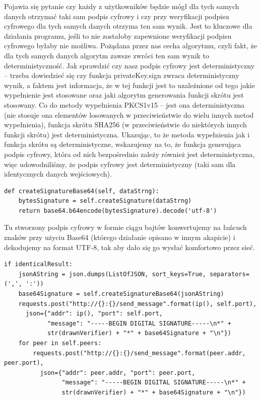 Pojawia się pytanie czy każdy z użytkowników będzie mógł dla tych samych danych otrzymać taki sam podpis cyfrowy i czy przy weryfikacji podpisu cyfrowego dla tych samych danych otrzyma ten sam wynik. Jest to kluczowe dla działania programu, jeśli to nie zostałoby zapewnione weryfikacji podpisu cyfrowego byłaby nie możliwa. Pożądana przez nas cecha algorytmu, czyli fakt, że dla tych samych danych algorytm zawsze zwróci ten sam wynik to deterministyczność. Jak sprawdzić czy nasz podpis cyfrowy jest deterministyczny – trzeba dowiedzieć się czy funkcja privateKey.sign zwraca deterministyczny wynik, a faktem jest informacja, że w tej funkcji jest to uzależnione od tego jakie wypełnienie jest stosowane oraz jaki algorytm generowania funkcji skrótu jest stosowany. Co do metody wypełnienia PKCS1v15 – jest ona deterministyczna (nie stosuje ona elementów losowanych w przeciwieństwie do wielu innych metod wypełnienia), funkcja skrótu SHA256 (w przeciwieństwie do niektórych innych funkcji skrótu) jest deterministyczna. Ukazując, to że metoda wypełnienia jak i funkcja skrótu są deterministyczne, wskazujemy na to, że funkcja generująca podpis cyfrowy, która od nich bezpośrednio zależy również jest deterministyczna, więc udowodniliśmy, że podpis cyfrowy jest deterministyczny (taki sam dla identycznych danych wejściowych).
\begin{lstlisting}
def createSignatureBase64(self, dataStrng):
    bytesSignature = self.createSignature(dataStrng)
    return base64.b64encode(bytesSignature).decode('utf-8')
\end{lstlisting}
Tu stworzony podpis cyfrowy w formie ciągu bajtów konwertujemy na łańcuch znaków przy użyciu Base64 (którego działanie opisano w innym akapicie) i dekodujemy na format UTF-8, tak aby dało się go wysłać komfortowo przez sieć.
\begin{lstlisting}
if identicalResult:
    jsonAString = json.dumps(ListOfJSON, sort_keys=True, separators=(',', ':'))
    base64Signature = self.createSignatureBase64(jsonAString)
    requests.post("http://{}:{}/send_message".format(ip(), self.port),
      json={"addr": ip(), "port": self.port,
            "message": "-----BEGIN DIGITAL SIGNATURE-----\n*" + 
            str(drawnVerifier) + "*" + base64Signature + "\n"})
    for peer in self.peers:
        requests.post("http://{}:{}/send_message".format(peer.addr, peer.port),
          json={"addr": peer.addr, "port": peer.port,
                "message": "-----BEGIN DIGITAL SIGNATURE-----\n*" + 
                str(drawnVerifier) + "*" + base64Signature + "\n"})
\end{lstlisting}
